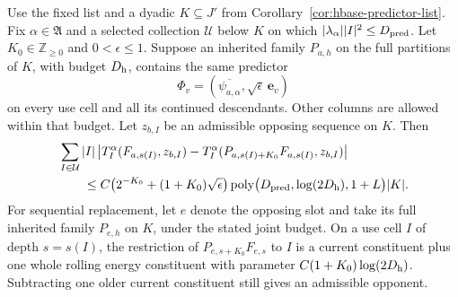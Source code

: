\begin{lemma}
\label{lem:hbase-delayed}
Use the fixed list and a dyadic \(K\subseteq J'\) from
Corollary~\ref{cor:hbase-predictor-list}.  Fix \(\alpha\in\mathfrak A\)
and a selected collection \(\mathcal U\) below \(K\) on which
\(|\lambda_\alpha||I|^2\le D_{\rm pred}\).  Let
\(K_0\in\mathbb Z_{\ge0}\) and \(0<\epsilon\le1\).
Suppose an inherited family \(P_{a,h}\) on the full partitions of
\(K\), with budget \(D_{\rm h}\), contains the same predictor
\[
 \Phi_v=(\overline{\psi_{a,\alpha}},\sqrt\epsilon\,\mathbf e_v)
\]
on every use cell and all its continued descendants.  Other columns
are allowed within that budget.  Let \(z_{b,I}\) be an admissible
opposing sequence on \(K\).  Then
\begin{align}
 &\sum_{I\in\mathcal U}|I|
 \left|T_I^\alpha(F_{a,s(I)},z_{b,I})
       -T_I^\alpha(P_{a,s(I)+K_0}F_{a,s(I)},z_{b,I})\right|
 \nonumber\\
 &\qquad\le
 C\bigl(2^{-K_0}+(1+K_0)\sqrt\epsilon\bigr)
 \operatorname{poly}\bigl(D_{\rm pred},\log(2D_{\rm h}),1+L\bigr)|K|.
                                                                    \label{eq:hbase-delayed}
\end{align}
For sequential replacement, let \(e\) denote the opposing slot and take
its full inherited family \(P_{e,h}\) on \(K\), under the stated joint budget.  On a use
cell \(I\) of depth \(s=s(I)\), the restriction of
\(P_{e,s+K_0}F_{e,s}\) to \(I\) is a current
constituent plus one whole rolling energy constituent with parameter
\(C(1+K_0)\log(2D_{\rm h})\).  Subtracting one older current
constituent still gives an admissible opponent.
\end{lemma}

